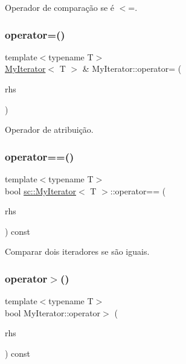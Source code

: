 Operador de comparação se é $<$=. 

\mbox{\label{classsc_1_1MyIterator_af36f2a583da36cbd26ea491a09810e42}} 
\subsubsection{\texorpdfstring{operator=()}{operator=()}}
{\footnotesize\ttfamily template$<$typename T$>$ \\
\hyperlink{classsc_1_1MyIterator}{My\+Iterator}$<$ T $>$ \& My\+Iterator\+::operator= (\begin{DoxyParamCaption}\item[{const \hyperlink{classsc_1_1MyIterator}{My\+Iterator}$<$ T $>$ \&}]{rhs }\end{DoxyParamCaption})}



Operador de atribuição. 

\mbox{\label{classsc_1_1MyIterator_afde62290f677ab0c46f739008e7ed111}} 
\subsubsection{\texorpdfstring{operator==()}{operator==()}}
{\footnotesize\ttfamily template$<$typename T$>$ \\
bool \hyperlink{classsc_1_1MyIterator}{sc\+::\+My\+Iterator}$<$ T $>$\+::operator== (\begin{DoxyParamCaption}\item[{const \hyperlink{classsc_1_1MyIterator}{My\+Iterator}$<$ T $>$ \&}]{rhs }\end{DoxyParamCaption}) const}



Comparar dois iteradores se são iguais. 

\mbox{\label{classsc_1_1MyIterator_ab8ca63fa245d05aebc771422c7861dc7}} 
\subsubsection{\texorpdfstring{operator$>$()}{operator>()}}
{\footnotesize\ttfamily template$<$typename T$>$ \\
bool My\+Iterator\+::operator$>$ (\begin{DoxyParamCaption}\item[{const \hyperlink{classsc_1_1MyIterator}{My\+Iterator}$<$ T $>$ \&}]{rhs }\end{DoxyParamCaption}) const}



